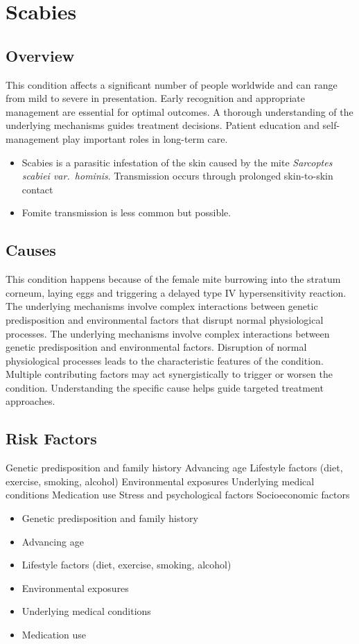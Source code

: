 \chapter{Scabies}
\label{sec:Scabies}

\section{Overview}
This condition affects a significant number of people worldwide and can range from mild to severe in presentation. Early recognition and appropriate management are essential for optimal outcomes. A thorough understanding of the underlying mechanisms guides treatment decisions. Patient education and self-management play important roles in long-term care.

\begin{itemize}[noitemsep]
  \item Scabies is a parasitic infestation of the skin caused by the mite \textit{Sarcoptes scabiei var.~hominis}. Transmission occurs through prolonged skin-to-skin contact
  \item Fomite transmission is less common but possible.
\end{itemize}
\section{Causes}
This condition happens because of the female mite burrowing into the stratum corneum, laying eggs and triggering a delayed type IV hypersensitivity reaction. The underlying mechanisms involve complex interactions between genetic predisposition and environmental factors that disrupt normal physiological processes. The underlying mechanisms involve complex interactions between genetic predisposition and environmental factors. Disruption of normal physiological processes leads to the characteristic features of the condition. Multiple contributing factors may act synergistically to trigger or worsen the condition. Understanding the specific cause helps guide targeted treatment approaches.
\section{Risk Factors}
Genetic predisposition and family history Advancing age Lifestyle factors (diet, exercise, smoking, alcohol) Environmental exposures Underlying medical conditions Medication use Stress and psychological factors Socioeconomic factors

\begin{itemize}[noitemsep]
  \item Genetic predisposition and family history
  \item Advancing age
  \item Lifestyle factors (diet, exercise, smoking, alcohol)
  \item Environmental exposures
  \item Underlying medical conditions
  \item Medication use
\end{itemize}

